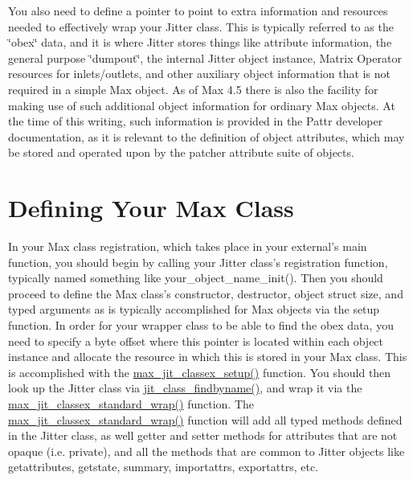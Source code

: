 You also need to define a pointer to point to extra information and resources needed to effectively wrap your Jitter class. This is typically referred to as the \char`\"{}obex\char`\"{} data, and it is where Jitter stores things like attribute information, the general purpose \char`\"{}dumpout\char`\"{}, the internal Jitter object instance, Matrix Operator resources for inlets/outlets, and other auxiliary object information that is not required in a simple Max object. As of Max 4.5 there is also the facility for making use of such additional object information for ordinary Max objects. At the time of this writing, such information is provided in the Pattr developer documentation, as it is relevant to the definition of object attributes, which may be stored and operated upon by the patcher attribute suite of objects.\hypertarget{chapter_jit_maxwrappers_chapter_jit_maxwrappers_classdef}{}\section{Defining Your Max Class}\label{chapter_jit_maxwrappers_chapter_jit_maxwrappers_classdef}
In your Max class registration, which takes place in your external's main function, you should begin by calling your Jitter class's registration function, typically named something like your\_\-object\_\-name\_\-init(). Then you should proceed to define the Max class's constructor, destructor, object struct size, and typed arguments as is typically accomplished for Max objects via the setup function. In order for your wrapper class to be able to find the obex data, you need to specify a byte offset where this pointer is located within each object instance and allocate the resource in which this is stored in your Max class. This is accomplished with the \hyperlink{group__maxwrapmod_ga773b6e6430d9de2e295419c7f038979e}{max\_\-jit\_\-classex\_\-setup()} function. You should then look up the Jitter class via \hyperlink{group__classmod_ga63eb9d25f881cd6fba11e24f9ac9b02f}{jit\_\-class\_\-findbyname()}, and wrap it via the \hyperlink{group__maxwrapmod_ga9b8377bdccc2497e02582c72204b5250}{max\_\-jit\_\-classex\_\-standard\_\-wrap()} function. The \hyperlink{group__maxwrapmod_ga9b8377bdccc2497e02582c72204b5250}{max\_\-jit\_\-classex\_\-standard\_\-wrap()} function will add all typed methods defined in the Jitter class, as well getter and setter methods for attributes that are not opaque (i.e. private), and all the methods that are common to Jitter objects like getattributes, getstate, summary, importattrs, exportattrs, etc.

